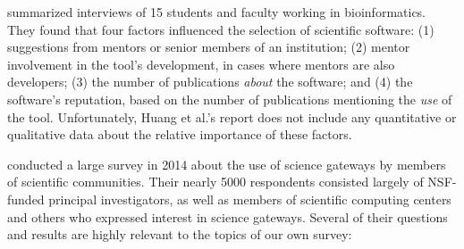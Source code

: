 \documentclass{casicswhitepaper}
\begin{document}
\citet{huang2013provenance} summarized interviews of 15 students and faculty working in bioinformatics.  They found that four factors influenced the selection of scientific software: (1) suggestions from mentors or senior members of an institution; (2) mentor involvement in the tool's development, in cases where mentors are also developers; (3) the number of publications \emph{about} the software; and (4) the software's reputation, based on the number of publications mentioning the \emph{use} of the tool.  Unfortunately, Huang et al.'s report does not include any quantitative or qualitative data about the relative importance of these factors.

\citet{lawrence2015science, lawrence2014who} conducted a large survey in 2014 about the use of science gateways by members of scientific communities.  Their nearly 5000 respondents consisted largely of NSF-funded principal investigators, as well as members of scientific computing centers and others who expressed interest in science gateways.  Several of their questions and results are highly relevant to the topics of our own survey:
\end{document}
